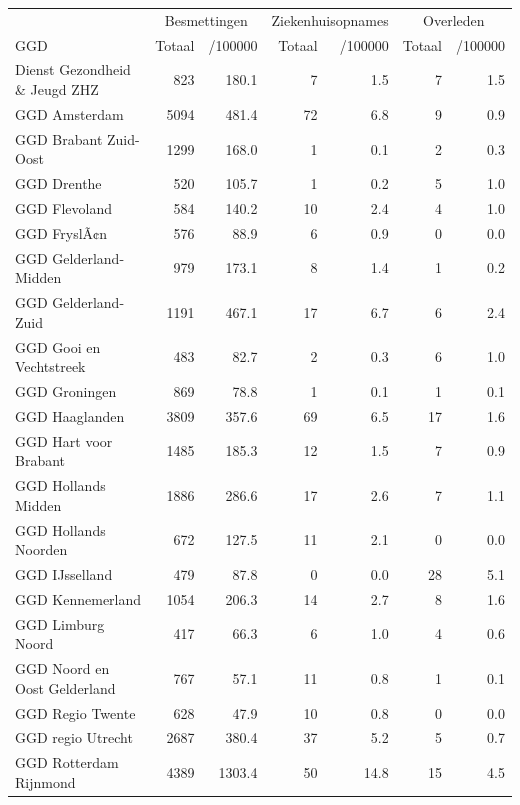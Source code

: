 \documentclass[
  english,
  man,floatsintext]{apa6}
\begin{document}
\begin{table}[H]
\centering\begingroup\fontsize{10}{12}\selectfont

\begin{threeparttable}
\begin{tabular}{lrrrrrr}
\toprule
\multicolumn{1}{c}{ } & \multicolumn{2}{c}{Besmettingen} & \multicolumn{2}{c}{Ziekenhuisopnames} & \multicolumn{2}{c}{Overleden} \\
\cmidrule(l{3pt}r{3pt}){2-3} \cmidrule(l{3pt}r{3pt}){4-5} \cmidrule(l{3pt}r{3pt}){6-7}
GGD & Totaal & /100000 & Totaal & /100000 & Totaal & /100000\\
\midrule
Dienst Gezondheid \& Jeugd ZHZ & 823 & 180.1 & 7 & 1.5 & 7 & 1.5\\
GGD Amsterdam & 5094 & 481.4 & 72 & 6.8 & 9 & 0.9\\
GGD Brabant Zuid-Oost & 1299 & 168.0 & 1 & 0.1 & 2 & 0.3\\
GGD Drenthe & 520 & 105.7 & 1 & 0.2 & 5 & 1.0\\
GGD Flevoland & 584 & 140.2 & 10 & 2.4 & 4 & 1.0\\
GGD FryslÃ¢n & 576 & 88.9 & 6 & 0.9 & 0 & 0.0\\
GGD Gelderland-Midden & 979 & 173.1 & 8 & 1.4 & 1 & 0.2\\
GGD Gelderland-Zuid & 1191 & 467.1 & 17 & 6.7 & 6 & 2.4\\
GGD Gooi en Vechtstreek & 483 & 82.7 & 2 & 0.3 & 6 & 1.0\\
GGD Groningen & 869 & 78.8 & 1 & 0.1 & 1 & 0.1\\
GGD Haaglanden & 3809 & 357.6 & 69 & 6.5 & 17 & 1.6\\
GGD Hart voor Brabant & 1485 & 185.3 & 12 & 1.5 & 7 & 0.9\\
GGD Hollands Midden & 1886 & 286.6 & 17 & 2.6 & 7 & 1.1\\
GGD Hollands Noorden & 672 & 127.5 & 11 & 2.1 & 0 & 0.0\\
GGD IJsselland & 479 & 87.8 & 0 & 0.0 & 28 & 5.1\\
GGD Kennemerland & 1054 & 206.3 & 14 & 2.7 & 8 & 1.6\\
GGD Limburg Noord & 417 & 66.3 & 6 & 1.0 & 4 & 0.6\\
GGD Noord en Oost Gelderland & 767 & 57.1 & 11 & 0.8 & 1 & 0.1\\
GGD Regio Twente & 628 & 47.9 & 10 & 0.8 & 0 & 0.0\\
GGD regio Utrecht & 2687 & 380.4 & 37 & 5.2 & 5 & 0.7\\
GGD Rotterdam Rijnmond & 4389 & 1303.4 & 50 & 14.8 & 15 & 4.5\\

\end{tabular}
\end{threeparttable}
\end{table}
\end{document}
